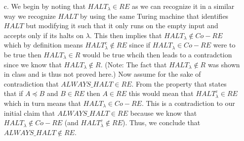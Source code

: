\documentclass [10pt]{article}
\newcommand{\reduces}{\preceq}%
\begin{document}
\begin{enumerate}
\begin{enumerate}
		\item[c.]We begin by noting that $HALT_{\lambda}\in RE$ as we can recognize it in a similar way we recognize $HALT$ by using the same Turing machine that identifies $HALT$ but modifying it such that it only runs on the empty input and accepts only if its halts on $\lambda$. This then implies that $HALT_{\lambda}\notin Co-RE$ which by definition means $HALT_{\lambda}^{c}\notin RE$ since if $HALT_{\lambda}\in Co-RE$ were to be true then $HALT_{\lambda}\in R$ would be true whcih then leads to a contradction since we know that $HALT_{\lambda}\notin R$. (Note: The fact that $HALT_{\lambda}\notin R$ was shown in class and is thus not proved here.) Now assume for the sake of contradiction that $ALWAYS\_HALT\in RE$. From the property that states that if $A\reduces B$ and $B\in RE$ then $A\in RE$ this would mean that $HALT_{\lambda}^{c}\in RE$ which in turn means that $HALT_{\lambda}\in Co-RE$. This is a contradiction to our initial claim that $ALWAYS\_HALT\in RE$ because we know that $HALT_{\lambda}\notin Co-RE$ (and $HALT_{\lambda}^{c}\notin RE$). Thus, we conclude that $ALWAYS\_HALT\notin RE$.
	\end{enumerate}
\end{enumerate}
\end{document}
